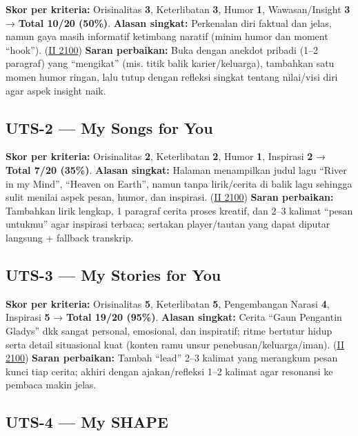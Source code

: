 \documentclass[
  letterpaper,
  DIV=11,
  numbers=noendperiod]{scrreprt}
\begin{document}
\textbf{Skor per kriteria:} Orisinalitas \textbf{3}, Keterlibatan
\textbf{3}, Humor \textbf{1}, Wawasan/Insight \textbf{3} → \textbf{Total
10/20 (50\%)}. \textbf{Alasan singkat:} Perkenalan diri faktual dan
jelas, namun gaya masih informatif ketimbang naratif (minim humor dan
moment ``hook''). (\href{https://ii-2100.github.io/all-about-me/}{II
2100}) \textbf{Saran perbaikan:} Buka dengan anekdot pribadi (1--2
paragraf) yang ``mengikat'' (mis. titik balik karier/keluarga),
tambahkan satu momen humor ringan, lalu tutup dengan refleksi singkat
tentang nilai/visi diri agar aspek insight naik.

\subsection{UTS-2 --- My Songs for You}\label{uts-2-my-songs-for-you-1}

\textbf{Skor per kriteria:} Orisinalitas \textbf{2}, Keterlibatan
\textbf{2}, Humor \textbf{1}, Inspirasi \textbf{2} → \textbf{Total 7/20
(35\%)}. \textbf{Alasan singkat:} Halaman menampilkan judul lagu ``River
in my Mind'', ``Heaven on Earth'', namun tanpa lirik/cerita di balik
lagu sehingga sulit menilai aspek pesan, humor, dan inspirasi.
(\href{https://ii-2100.github.io/all-about-me/My_Song_for_You/index.html}{II
2100}) \textbf{Saran perbaikan:} Tambahkan lirik lengkap, 1 paragraf
cerita proses kreatif, dan 2--3 kalimat ``pesan untukmu'' agar inspirasi
terbaca; sertakan player/tautan yang dapat diputar langsung + fallback
transkrip.

\subsection{UTS-3 --- My Stories for
You}\label{uts-3-my-stories-for-you-1}

\textbf{Skor per kriteria:} Orisinalitas \textbf{5}, Keterlibatan
\textbf{5}, Pengembangan Narasi \textbf{4}, Inspirasi \textbf{5} →
\textbf{Total 19/20 (95\%)}. \textbf{Alasan singkat:} Cerita ``Gaun
Pengantin Gladys'' dkk sangat personal, emosional, dan inspiratif; ritme
bertutur hidup serta detail situasional kuat (konten ramu unsur
penebusan/keluarga/iman).
(\href{https://ii-2100.github.io/all-about-me/My_Stories_for_You/index.html}{II
2100}) \textbf{Saran perbaikan:} Tambah ``lead'' 2--3 kalimat yang
merangkum pesan kunci tiap cerita; akhiri dengan ajakan/refleksi 1--2
kalimat agar resonansi ke pembaca makin jelas.

\subsection{UTS-4 --- My SHAPE}\label{uts-4-my-shape}
\end{document}
